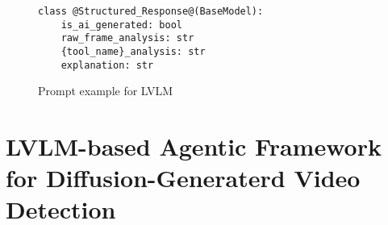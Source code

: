 \begin{figure}[t]
\begin{tcolorbox}[colback=white!5!white,colframe=gray!2!gray,arc=2mm,fontupper=\small]
\begin{adjustbox}{minipage=[c][0.36\linewidth]{1\linewidth}}

\vspace{1mm}
\end{adjustbox}
\end{tcolorbox}
\vspace{-2mm}
\begin{tcolorbox}[colback=white!5!white,colframe=gray!2!gray,arc=2mm,fontupper=\small]
\begin{adjustbox}{minipage=[c][0.20\linewidth]{1\linewidth}}
\begin{lstlisting}[basicstyle=\footnotesize, style=base]
class @Structured_Response@(BaseModel):
    is_ai_generated: bool
    raw_frame_analysis: str
    {tool_name}_analysis: str
    explanation: str
\end{lstlisting}
\end{adjustbox}
\end{tcolorbox}
\vspace{-4mm}
\caption{Prompt example for LVLM}
\label{fig:prompt_exp}
\end{figure}



\section{LVLM-based Agentic Framework for Diffusion-Generaterd Video Detection}
\label{sec:method}

